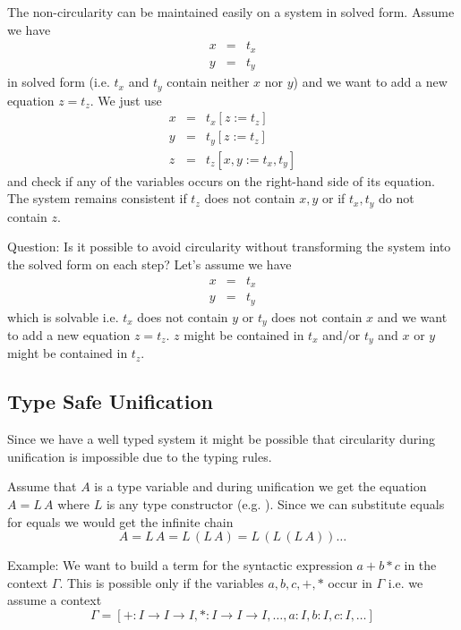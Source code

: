 The non-circularity can be maintained easily on a system in solved
form. Assume we have
$$
%
\begin{array}{lll}
  x &=& t_x
  \\
  y &=& t_y
\end{array}
$$
%
in solved form (i.e. $t_x$ and $t_y$ contain neither $x$ nor $y$) and we want
to add a new equation $z = t_z$. We just use
$$
%
\begin{array}{lll}
  x &=& t_x[z := t_z]
  \\
  y &=& t_y[z := t_z]
  \\
  z &=& t_z[x,y := t_x, t_y]
\end{array}
$$
%
and check if any of the variables occurs on the right-hand side of its
equation. The system remains consistent if $t_z$ does not contain $x,y$ or if
$t_x,t_y$ do not contain $z$.


Question: Is it possible to avoid circularity without transforming the system
into the solved form on each step? Let's assume we have
$$
%
\begin{array}{lll}
  x &=& t_x
  \\
  y &=& t_y
\end{array}
$$
%
which is solvable i.e. $t_x$ does not contain $y$ or $t_y$ does not contain
$x$ and we want to add a new equation $z = t_z$. $z$ might be contained in
$t_x$ and/or $t_y$ and $x$ or $y$ might be contained in $t_z$.




\subsection{Type Safe Unification}

Since we have a well typed system it might be possible that circularity during
unification is impossible due to the typing rules.

Assume that $A$ is a type variable and during unification we get the equation
$A = L\, A$ where $L$ is any type constructor (e.g. ). Since we can
substitute equals for equals we would get the infinite chain
$$
  A = L\, A = L\, (L\, A) = L\, (L\, (L\, A)) \ldots
$$



Example: We want to build a term for the syntactic expression $a + b * c$ in
the context $\Gamma$. This is possible only if the variables $a, b, c, +, *$
occur in $\Gamma$ i.e. we assume a context
$$
\Gamma = [+:I\to I\to I, *:I\to I\to I, \ldots, a:I, b:I, c:I, \ldots]
$$


